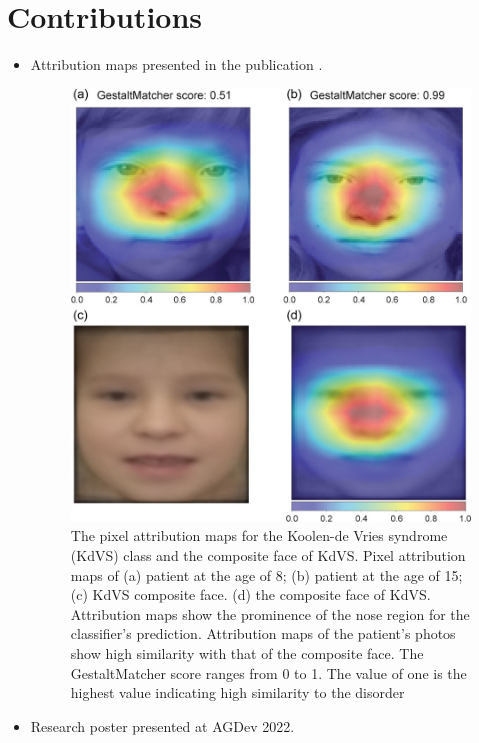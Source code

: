 \documentclass[../report.tex]{subfiles}
\begin{document}
    \chapter{Contributions}\label{ch_contributions}
    \begin{itemize}
    \item Attribution maps presented in the publication \cite{brand2022next}.
      \begin{figure}[H]
      	\centering
      	\includegraphics[scale=0.4]{images/kdvs.jpg}
      	\caption{The pixel attribution maps for the Koolen-de Vries syndrome (KdVS) class and the composite face of KdVS. Pixel attribution maps of (a) patient at the age of 8; (b) patient at the age of 15; (c) KdVS composite face. (d) the composite face of KdVS. Attribution maps show the prominence of the nose region for the classifier's prediction. Attribution maps of the patient's photos show high similarity with that of the composite face. The GestaltMatcher score ranges from 0 to 1. The value of one is the highest value indicating high similarity to the disorder}
      \end{figure}
  	\item Research poster presented at AGDev 2022.
      \begin{figure}

\end{figure}
\end{itemize}
\end{document}

